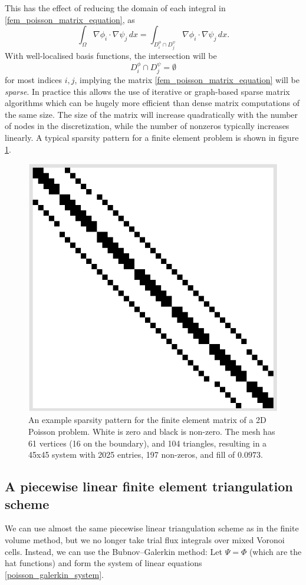 This has the effect of reducing the domain of each integral in \eqref{fem_poisson_matrix_equation}, as
    $$\int_\Omega \nabla\phi_i \cdot \nabla\psi_j\,dx = \int_{D_i^\phi \cap D_j^\psi} \nabla\phi_i \cdot \nabla\psi_j\,dx. $$
With well-localised basis functions, the intersection will be
    $$D_i^\phi \cap D_j^\psi = \emptyset$$
for most indices $i,j$, implying the matrix \eqref{fem_poisson_matrix_equation} will be \textit{sparse}. In practice this allows
the use of iterative or graph-based sparse matrix algorithms which can be hugely more efficient than dense matrix computations of the same size.
The size of the matrix will increase quadratically with the number of nodes in the discretization, while the number of nonzeros
typically increases linearly.
A typical sparsity pattern for a finite element problem is shown in figure \ref{sparsity_pattern}.

\begin{figure}[H]
    \begin{center}
        \includegraphics[width=0.26\linewidth]{figures/sparsity_pattern_no_text.png}
    \end{center}
    \caption{\scriptsize
        An example sparsity pattern for the finite element matrix of a 2D Poisson problem. White is zero and black is non-zero.
        The mesh has 61 vertices (16 on the boundary), and 104 triangles, resulting in a 45x45 system with 2025 entries, 197 non-zeros, and fill of $0.0973$.
    }
    \label{sparsity_pattern}
\end{figure}

\subsection{A piecewise linear finite element triangulation scheme}
We can use almost the same piecewise linear triangulation scheme as in the finite volume method, but we no longer
take trial flux integrals over mixed Voronoi cells. Instead, we can use the Bubnov--Galerkin method: Let $\Psi = \Phi$
(which are the hat functions) and form the system of linear equations \eqref{poisson_galerkin_system}.
